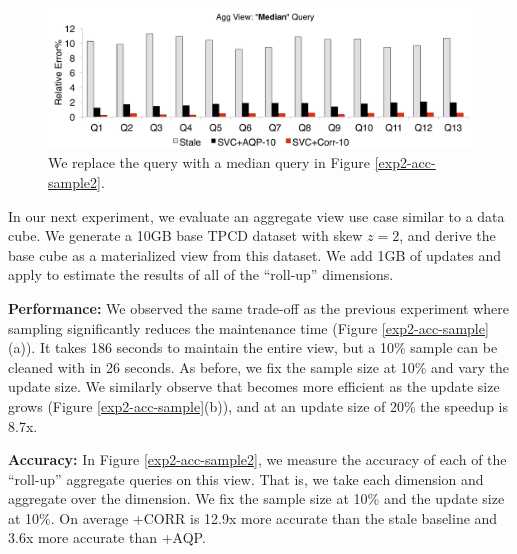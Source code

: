 
\begin{figure}[t]
\centering
  \includegraphics[scale=0.15]{exp/msdc_5.pdf}
 \caption{We replace the \sumfunc query with a median query in Figure \ref{exp2-acc-sample2}. \label{exp2-median} }
\end{figure}

In our next experiment, we evaluate an aggregate view use case similar to a data cube.
We generate a 10GB base TPCD dataset with skew $z=2$, and derive the base cube as a materialized view from this dataset.
We add 1GB of updates and apply \svc to estimate the results of all of the ``roll-up'' dimensions.

\textbf{Performance: }
We observed the same trade-off as the previous experiment where sampling significantly reduces the maintenance time (Figure \ref{exp2-acc-sample}(a)).
It takes 186 seconds to maintain the entire view, but a 10\% sample can be cleaned with \svc in 26 seconds.
As before, we fix the sample size at 10\% and vary the update size.
We similarly observe that \svc becomes more efficient as the update size grows (Figure \ref{exp2-acc-sample}(b)), and at an update size of 20\%  the speedup is 8.7x.

\textbf{Accuracy: }
In Figure \ref{exp2-acc-sample2}, we measure the accuracy of each of the ``roll-up'' aggregate queries on this view.
That is, we take each dimension and aggregate over the dimension.
We fix the sample size at 10\% and the update size at 10\%.
On average \svcnospace+CORR is 12.9x more accurate than the stale baseline and 3.6x more accurate than \svcnospace+AQP. 

